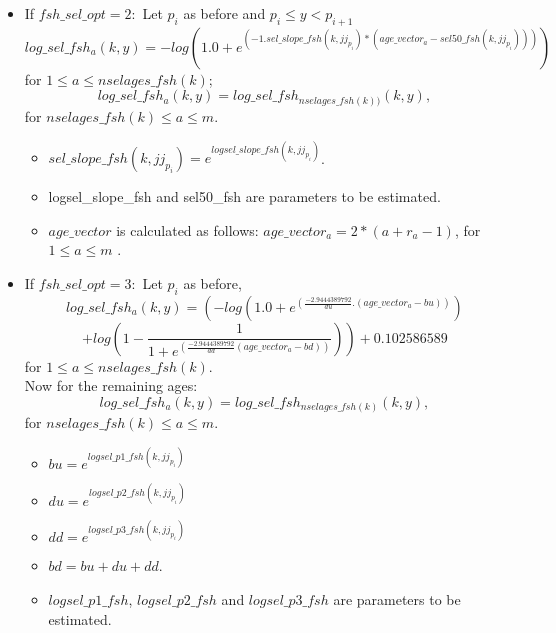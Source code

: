 \documentclass{article}
\begin{document}
\begin{itemize}
\item If $fsh\_sel\_opt=2:$ 
Let $p_i$ as before and  $p_i\leq y < p_{i+1}$
\begin{equation}
            log\_sel\_fsh_a(k,y)=-log( 1.0 + e^{(-1.sel\_slope\_fsh(k,jj_{p_i}) * ( age\_vector_a - sel50\_fsh(k,jj_{p_i})) )})
        \end{equation}
        for $1\leq a \leq nselages\_fsh(k)$;
        \begin{equation}
            log\_sel\_fsh_a(k,y)=log\_sel\_fsh_{nselages\_fsh(k))}(k,y),
        \end{equation}
        for $nselages\_fsh(k) \leq a \leq m$.
        \begin{itemize}
            \item $sel\_slope\_fsh(k,jj_{p_i}) = e^{logsel\_slope\_fsh(k,jj_{p_i})}$.
            \item logsel\_slope\_fsh and sel50\_fsh are parameters to be estimated.
            \item $age\_vector$ is calculated as follows: $age\_vector_a=2*(a+r_a-1)$, for $1\leq a \leq m$
            .
        \end{itemize}


        
\item If $fsh\_sel\_opt=3:$ Let $p_i$ as before,
 \begin{equation}
        log\_sel\_fsh_a(k,y)     = \left( -log(1.0 + e^{(\frac{-2.9444389792}{du}.( age\_vector_a - bu) )}) \right.
    \end{equation}
    \begin{equation*}
         \left.+log\left(1 - \dfrac{1}{1 + e^{\left(\frac{-2.9444389792}{dd} ( age\_vector_a - bd)\right)}} \right) \right)+0.102586589 
    \end{equation*}
      for $1\leq a \leq nselages\_fsh(k)$.\\
      Now for the remaining ages:
    \begin{equation}
        log\_sel\_fsh_a(k,y) = log\_sel\_fsh_{nselages\_fsh(k)}(k,y),
    \end{equation}
    for $nselages\_fsh(k)\leq a \leq m$.
    \begin{itemize}
        \item %
        $bu = e^{logsel\_p1\_fsh(k,jj_{p_i})}$
        \item 
        $du = e^{logsel\_p2\_fsh(k,jj_{p_i})}$
        \item
        $dd = e^{logsel\_p3\_fsh(k,jj_{p_i})}$
        \item $bd = bu + du + dd$.
        \item $logsel\_p1\_fsh$, $logsel\_p2\_fsh$ and $logsel\_p3\_fsh$ are parameters to be estimated.
    \end{itemize}
    
    \end{itemize}
\end{document}
